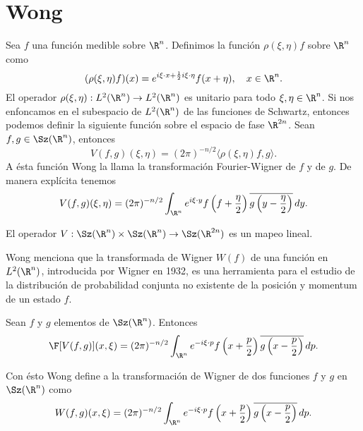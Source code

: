 \section{Wong}

Sea $f$ una función medible sobre $\R^{n}$. Definimos la
función $\rho(\xi,\eta)f$ sobre $\R^{n}$ como
\begin{equation}
  (\rho(\xi,\eta)f)(x)
  = e^{i\xi \cdot x + \frac{1}{2} i \xi \cdot \eta}
  f(x+\eta),
  \quad x \in \R^{n}.
\end{equation}
El operador $\rho(\xi,\eta) : L^2(\R^{n}) \to L^2(\R^{n})$
es unitario para todo $\xi, \eta \in \R^{n}$. Si nos
enfoncamos en el subespacio de $L^2(\R^{n})$ de las
funciones de Schwartz, entonces podemos definir la
siguiente función sobre el espacio de fase $\R^{2n}$. Sean
$f,g \in \Sz(\R^{n})$, entonces
\begin{equation}
  V(f,g)(\xi,\eta)
  = (2\pi)^{-n / 2} \langle \rho(\xi,\eta)f, g \rangle.
\end{equation}
A ésta función Wong la llama la transformación
Fourier-Wigner de $f$ y de $g$. De manera explícita
tenemos 
\begin{equation}
  V(f,g)(\xi,\eta)
  = (2\pi)^{-n / 2} \int_{\R^{n}} e^{i \xi \cdot y}
  f\left( f + \frac{\eta}{2} \right) \overline{g\left( y -
  \frac{\eta}{2}\right) } \, dy.
\end{equation}

El operador $V : \Sz(\R^{n}) \times \Sz(\R^{n}) \to
\Sz(\R^{2n})$ es un mapeo lineal.

Wong menciona que la transformada de Wigner $W(f)$ de una
función en $L^2(\R^{n})$, introducida por Wigner en 1932,
es una herramienta para el estudio de la distribución de
probabilidad conjunta no existente de la posición y
momentum de un estado $f$.

\begin{theorem}
  Sean $f$ y $g$ elementos de $\Sz(\R^{n})$. Entonces
  \begin{equation}
    \F[V(f,g)](x,\xi)
    = (2\pi)^{-n / 2} \int_{\R^{n}} e^{-i \xi \cdot p
    } f\left( x + \frac{p}{2} \right)
    \overline{g\left( x - \frac{p}{2} \right)} \, dp.
  \end{equation}
\end{theorem}

Con ésto Wong define a la transformación de Wigner de dos
funciones $f$ y $g$ en $\Sz(\R^{n})$ como
\begin{equation}
  W(f,g)(x,\xi)
  = (2\pi)^{-n / 2} \int_{\R^{n}} e^{-i\xi \cdot p}
  f\left( x + \frac{p}{2} \right) \overline{g\left( x -
  \frac{p}{2} \right) } \, dp.
\end{equation}

